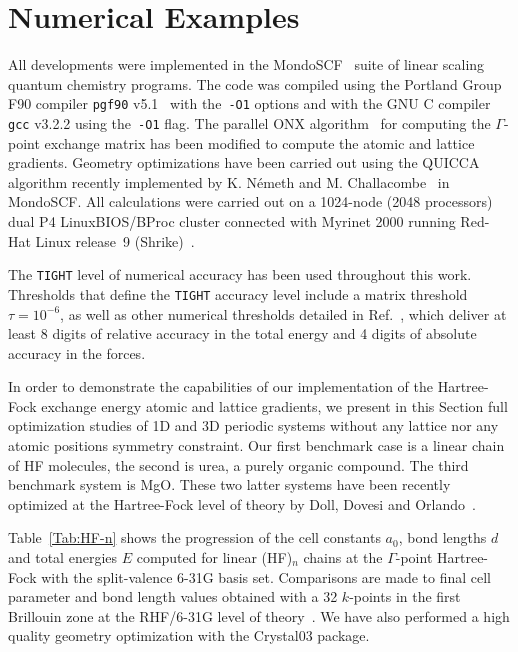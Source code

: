 \documentclass[prl,twocolumn,showpacs,twocolumngrid,superbib]{revtex4}
\begin{document}
\section{Numerical Examples}\label{Sec:NumExamples}
All developments were implemented in the {\sc MondoSCF}~\cite{MondoSCF} suite of
linear scaling quantum chemistry programs. The code was compiled 
using the Portland Group F90 compiler {\tt pgf90} v5.1~\cite{pgf90} 
with the~{\tt -O1} options and with the GNU C compiler {\tt gcc} 
v3.2.2 using the~{\tt -O1} flag.
The parallel ONX algorithm~\cite{VWeber05} for computing
the $\Gamma$-point exchange matrix has been modified to compute
the atomic and lattice gradients.
Geometry optimizations have been carried out using the QUICCA algorithm recently
implemented by K. N\'emeth and M. Challacombe~\cite{KNemeth04,KNemeth05} in {\sc MondoSCF}. 
All calculations were carried out on a 1024-node (2048 processors)
dual P4 LinuxBIOS/BProc cluster connected with Myrinet 2000 running
Red-Hat Linux release~9 (Shrike)~\cite{RedHat90}.



The {\tt TIGHT} level of numerical accuracy has been used throughout this work.  
Thresholds that define the {\tt TIGHT} accuracy level include a matrix 
threshold $\tau=10^{-6}$, as well as other numerical thresholds 
detailed in Ref.~\cite{CTymczak04a}, which deliver at least 8 digits of 
relative accuracy in the total energy and 4 digits of absolute accuracy 
in the forces.  

In order to demonstrate the capabilities of our implementation of the
Hartree-Fock exchange energy atomic and lattice gradients, we present in this Section 
full optimization studies of 1D and 3D periodic systems without any lattice 
nor any atomic positions symmetry constraint. 
Our first benchmark case is a linear chain of HF molecules, the second is
urea, a purely organic compound. The third benchmark system is MgO. 
These two latter systems have been recently optimized at the Hartree-Fock 
level of theory by Doll, Dovesi and Orlando~\cite{KDoll04}.

Table~\ref{Tab:HF-n} shows the progression of the cell constants $a_0$, bond lengths $d$ and
total energies $E$ computed for linear (HF)$_n$ chains at 
the $\Gamma$-point Hartree-Fock with the split-valence 6-31G basis set. 
Comparisons are made to final cell parameter and bond length values obtained 
with a 32 $k$-points in the first Brillouin zone at the 
RHF/6-31G level of theory~\cite{DJacquemin99B}. We have also performed a high quality
geometry optimization with the {\sc Crystal03} package.
\end{document}
